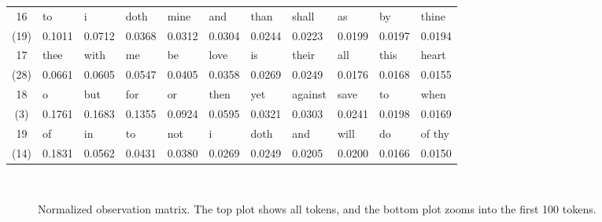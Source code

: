 \begin{table}[h!]
\begin{tabular}{c||l|l|l|l|l|l|l|l|l|l}
		16 & to & i & doth & mine & and & than & shall & as & by & thine \\
		(19) & 0.1011 & 0.0712 & 0.0368 & 0.0312 & 0.0304 & 0.0244 & 0.0223 & 0.0199 & 0.0197 & 0.0194 \\ \hline
		17 & thee & with & me & be & love & is & their & all & this & heart \\
		(28) & 0.0661 & 0.0605 & 0.0547 & 0.0405 & 0.0358 & 0.0269 & 0.0249 & 0.0176 & 0.0168 & 0.0155 \\ \hline
		18 & o & but & for & or & then & yet & against & save & to & when \\
		(3) & 0.1761 & 0.1683 & 0.1355 & 0.0924 & 0.0595 & 0.0321 & 0.0303 & 0.0241 & 0.0198 & 0.0169 \\ \hline
		19 & of & in & to & not & i & doth & and & will & do & of thy \\
		(14) & 0.1831 & 0.0562 & 0.0431 & 0.0380 & 0.0269 & 0.0249 & 0.0205 & 0.0200 & 0.0166 & 0.0150 \\ \hline
	\end{tabular}
\end{table}

\begin{figure}[h!]
	\centering
	 \\
	\caption{Normalized observation matrix. The top plot shows all tokens, and the bottom plot zooms into the first 100 tokens.}\label{fig:observation-matrix}
\end{figure}

